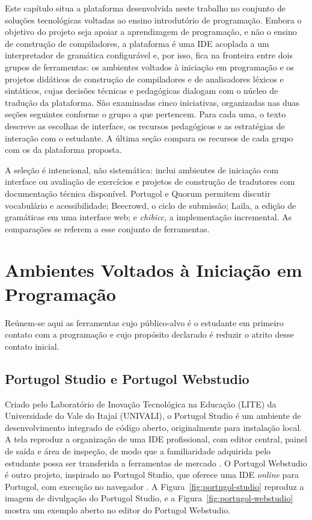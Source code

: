 
Este capítulo situa a plataforma desenvolvida neste trabalho no conjunto de soluções tecnológicas voltadas ao ensino introdutório de programação. Embora o objetivo do projeto seja apoiar a aprendizagem de programação, e não o ensino de construção de compiladores, a plataforma é uma IDE acoplada a um interpretador de gramática configurável e, por isso, fica na fronteira entre dois grupos de ferramentas: os ambientes voltados à iniciação em programação e os projetos didáticos de construção de compiladores e de analisadores léxicos e sintáticos, cujas decisões técnicas e pedagógicas dialogam com o núcleo de tradução da plataforma. São examinadas cinco iniciativas, organizadas nas duas seções seguintes conforme o grupo a que pertencem. Para cada uma, o texto descreve as escolhas de interface, os recursos pedagógicos e as estratégias de interação com o estudante. A última seção compara os recursos de cada grupo com os da plataforma proposta.

A seleção é intencional, não sistemática: inclui ambientes de iniciação com interface ou avaliação de exercícios e projetos de construção de tradutores com documentação técnica disponível. Portugol e Quorum permitem discutir vocabulário e acessibilidade; Beecrowd, o ciclo de submissão; Laila, a edição de gramáticas em uma interface web; e \textit{chibicc}, a implementação incremental. As comparações se referem a esse conjunto de ferramentas.

\section{Ambientes Voltados à Iniciação em Programação}

Reúnem-se aqui as ferramentas cujo público-alvo é o estudante em primeiro contato com a programação e cujo propósito declarado é reduzir o atrito desse contato inicial.

\subsection{Portugol Studio e Portugol Webstudio}

Criado pelo Laboratório de Inovação Tecnológica na Educação (LITE) da Universidade do Vale do Itajaí (UNIVALI), o Portugol Studio é um ambiente de desenvolvimento integrado de código aberto, originalmente para instalação local. A tela reproduz a organização de uma IDE profissional, com editor central, painel de saída e área de inspeção, de modo que a familiaridade adquirida pelo estudante possa ser transferida a ferramentas de mercado \cite{univali2026}. O Portugol Webstudio é outro projeto, inspirado no Portugol Studio, que oferece uma IDE \textit{online} para Portugol, com execução no navegador \cite{webstudio2026}. A Figura~\ref{fig:portugol-studio} reproduz a imagem de divulgação do Portugol Studio, e a Figura~\ref{fig:portugol-webstudio} mostra um exemplo aberto no editor do Portugol Webstudio.

